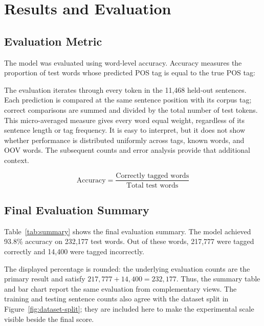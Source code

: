 \documentclass[12pt,a4paper]{article}
\begin{document}
\section{Results and Evaluation}

\subsection{Evaluation Metric}

The model was evaluated using word-level accuracy. Accuracy measures the
proportion of test words whose predicted POS tag is equal to the true POS tag:

The evaluation iterates through every token in the 11,468 held-out sentences.
Each prediction is compared at the same sentence position with its corpus tag;
correct comparisons are summed and divided by the total number of test tokens.
This micro-averaged measure gives every word equal weight, regardless of its
sentence length or tag frequency. It is easy to interpret, but it does not show
whether performance is distributed uniformly across tags, known words, and OOV
words. The subsequent counts and error analysis provide that additional context.

\begin{equation}
\text{Accuracy} =
\frac{\text{Correctly tagged words}}{\text{Total test words}}
\end{equation}

\subsection{Final Evaluation Summary}

Table~\ref{tab:summary} shows the final evaluation summary. The model achieved
93.8\% accuracy on 232,177 test words. Out of these words, 217,777 were tagged
correctly and 14,400 were tagged incorrectly.

The displayed percentage is rounded: the underlying evaluation counts are the
primary result and satisfy $217{,}777 + 14{,}400 = 232{,}177$. Thus, the summary
table and bar chart report the same evaluation from complementary views. The
training and testing sentence counts also agree with the dataset split in
Figure~\ref{fig:dataset-split}; they are included here to make the experimental
scale visible beside the final score.
\end{document}
